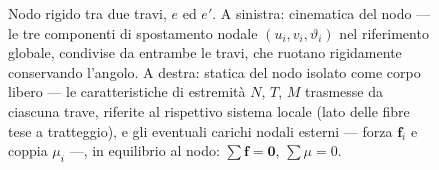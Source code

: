 \begin{figure}[htbp]
{
	}%
	\caption{Nodo rigido tra due travi, $e$ ed $e'$. A sinistra:
		cinematica del nodo --- le tre componenti di spostamento
		nodale $(u_i, v_i, \vartheta_i)$ nel riferimento globale,
		condivise da entrambe le travi, che ruotano rigidamente
		conservando l'angolo. A destra: statica del nodo isolato
		come corpo libero --- le caratteristiche di estremità
		$N$, $T$, $M$ trasmesse da ciascuna trave, riferite al
		rispettivo sistema locale (lato delle fibre tese a
		tratteggio), e gli eventuali carichi nodali esterni ---
		forza $\mathbf{f}_i$ e coppia $\mu_i$ ---, in equilibrio
		al nodo: $\sum\mathbf{f}=\mathbf{0}$, $\sum \mu= 0$.}
	\label{fig:nodo_rigido}
\end{figure}
